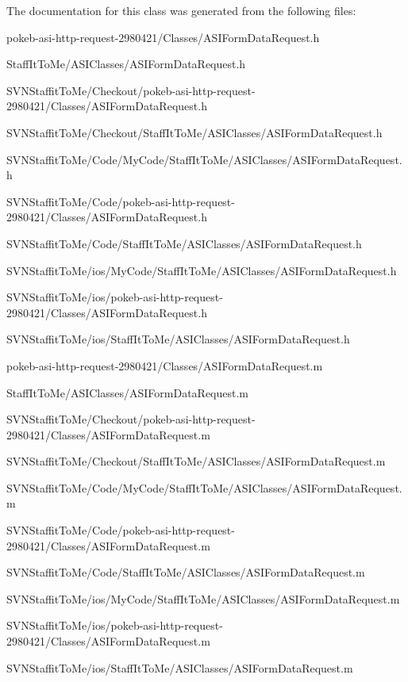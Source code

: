 \-The documentation for this class was generated from the following files\-:\begin{DoxyCompactItemize}
\item 
pokeb-\/asi-\/http-\/request-\/2980421/\-Classes/\-A\-S\-I\-Form\-Data\-Request.\-h\item 
\-Staff\-It\-To\-Me/\-A\-S\-I\-Classes/\-A\-S\-I\-Form\-Data\-Request.\-h\item 
\-S\-V\-N\-Staffit\-To\-Me/\-Checkout/pokeb-\/asi-\/http-\/request-\/2980421/\-Classes/\-A\-S\-I\-Form\-Data\-Request.\-h\item 
\-S\-V\-N\-Staffit\-To\-Me/\-Checkout/\-Staff\-It\-To\-Me/\-A\-S\-I\-Classes/\-A\-S\-I\-Form\-Data\-Request.\-h\item 
\-S\-V\-N\-Staffit\-To\-Me/\-Code/\-My\-Code/\-Staff\-It\-To\-Me/\-A\-S\-I\-Classes/\-A\-S\-I\-Form\-Data\-Request.\-h\item 
\-S\-V\-N\-Staffit\-To\-Me/\-Code/pokeb-\/asi-\/http-\/request-\/2980421/\-Classes/\-A\-S\-I\-Form\-Data\-Request.\-h\item 
\-S\-V\-N\-Staffit\-To\-Me/\-Code/\-Staff\-It\-To\-Me/\-A\-S\-I\-Classes/\-A\-S\-I\-Form\-Data\-Request.\-h\item 
\-S\-V\-N\-Staffit\-To\-Me/ios/\-My\-Code/\-Staff\-It\-To\-Me/\-A\-S\-I\-Classes/\-A\-S\-I\-Form\-Data\-Request.\-h\item 
\-S\-V\-N\-Staffit\-To\-Me/ios/pokeb-\/asi-\/http-\/request-\/2980421/\-Classes/\-A\-S\-I\-Form\-Data\-Request.\-h\item 
\-S\-V\-N\-Staffit\-To\-Me/ios/\-Staff\-It\-To\-Me/\-A\-S\-I\-Classes/\-A\-S\-I\-Form\-Data\-Request.\-h\item 
pokeb-\/asi-\/http-\/request-\/2980421/\-Classes/\-A\-S\-I\-Form\-Data\-Request.\-m\item 
\-Staff\-It\-To\-Me/\-A\-S\-I\-Classes/\-A\-S\-I\-Form\-Data\-Request.\-m\item 
\-S\-V\-N\-Staffit\-To\-Me/\-Checkout/pokeb-\/asi-\/http-\/request-\/2980421/\-Classes/\-A\-S\-I\-Form\-Data\-Request.\-m\item 
\-S\-V\-N\-Staffit\-To\-Me/\-Checkout/\-Staff\-It\-To\-Me/\-A\-S\-I\-Classes/\-A\-S\-I\-Form\-Data\-Request.\-m\item 
\-S\-V\-N\-Staffit\-To\-Me/\-Code/\-My\-Code/\-Staff\-It\-To\-Me/\-A\-S\-I\-Classes/\-A\-S\-I\-Form\-Data\-Request.\-m\item 
\-S\-V\-N\-Staffit\-To\-Me/\-Code/pokeb-\/asi-\/http-\/request-\/2980421/\-Classes/\-A\-S\-I\-Form\-Data\-Request.\-m\item 
\-S\-V\-N\-Staffit\-To\-Me/\-Code/\-Staff\-It\-To\-Me/\-A\-S\-I\-Classes/\-A\-S\-I\-Form\-Data\-Request.\-m\item 
\-S\-V\-N\-Staffit\-To\-Me/ios/\-My\-Code/\-Staff\-It\-To\-Me/\-A\-S\-I\-Classes/\-A\-S\-I\-Form\-Data\-Request.\-m\item 
\-S\-V\-N\-Staffit\-To\-Me/ios/pokeb-\/asi-\/http-\/request-\/2980421/\-Classes/\-A\-S\-I\-Form\-Data\-Request.\-m\item 
\-S\-V\-N\-Staffit\-To\-Me/ios/\-Staff\-It\-To\-Me/\-A\-S\-I\-Classes/\-A\-S\-I\-Form\-Data\-Request.\-m\end{DoxyCompactItemize}
